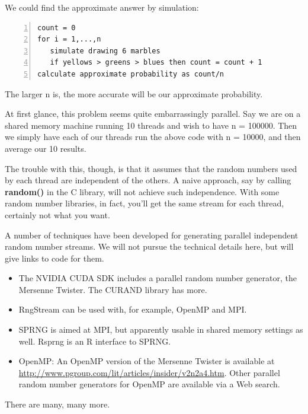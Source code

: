 We could find the approximate answer by simulation:

\begin{lstlisting}[numbers=left]
count = 0
for i = 1,...,n
   simulate drawing 6 marbles
   if yellows > greens > blues then count = count + 1
calculate approximate probability as count/n
\end{lstlisting}

The larger n is, the more accurate will be our approximate probability.

At first glance, this problem seems quite embarrassingly parallel.  Say
we are on a shared memory machine running 10 threads and wish to have n
= 100000.  Then we simply have each of our threads run the above code
with n = 10000, and then average our 10 results.

The trouble with this, though, is that it assumes that the random
numbers used by each thread are independent of the others.  A naive
approach, say by calling {\bf random()} in the C library, will not
achieve such independence.  With some random number libraries, in fact,
you'll get the same stream for each thread, certainly not what you want.

A number of techniques have been developed for generating parallel
independent random number streams.  We will not pursue the technical
details here, but will give links to code for them.

\begin{itemize}

\item The NVIDIA CUDA SDK includes a parallel random number
generator, the Mersenne Twister.  The CURAND library has more.

\item RngStream can be used with, for example, OpenMP and MPI.

\item SPRNG is aimed at MPI, but apparently usable in shared memory
settings as well.  Rsprng is an R interface to SPRNG.

\item OpenMP:  An OpenMP version of the Mersenne Twister is available at
\url{http://www.pgroup.com/lit/articles/insider/v2n2a4.htm}.  Other
parallel random number generators for OpenMP are available via a Web
search.

\end{itemize}

There are many, many more.


